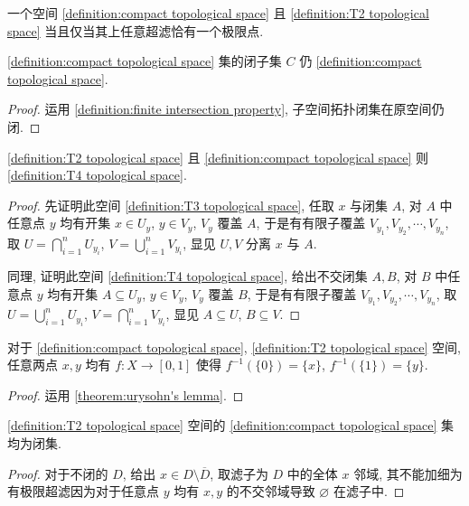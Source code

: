 \begin{corollary}
    一个空间 \ref{definition:compact topological space} 且 \ref{definition:T2 topological space} 当且仅当其上任意超滤恰有一个极限点.
\end{corollary}

\begin{lemma}
    \ref{definition:compact topological space} 集的闭子集 \(C\) 仍 \ref{definition:compact topological space}.

    \begin{proof}
        运用 \ref{definition:finite intersection property}, 子空间拓扑闭集在原空间仍闭.
    \end{proof}
\end{lemma}

\begin{lemma}
    \ref{definition:T2 topological space} 且 \ref{definition:compact topological space} 则 \ref{definition:T4 topological space}.

    \begin{proof}
        先证明此空间 \ref{definition:T3 topological space}, 任取 \(x\) 与闭集 \(A\),
        对 \(A\) 中任意点 \(y\) 均有开集 \(x \in U_y\), \(y \in V_y\), \(V_y\) 覆盖 \(A\), 于是有有限子覆盖 \(V_{y_1}, V_{y_2}, \cdots, V_{y_n}\),
        取 \(U = \bigcap_{i = 1}^n U_{y_i}\), \(V = \bigcup_{i = 1}^n V_{y_i}\), 显见 \(U,V\) 分离 \(x\) 与 \(A\).

        同理, 证明此空间 \ref{definition:T4 topological space}, 给出不交闭集 \(A,B\), 对 \(B\) 中任意点 \(y\) 均有开集 \(A \subseteq U_y\), \(y \in V_y\), \(V_y\) 覆盖 \(B\),
        于是有有限子覆盖 \(V_{y_1}, V_{y_2}, \cdots, V_{y_n}\), 取 \(U = \bigcup_{i = 1}^n U_{y_i}\), \(V = \bigcap_{i = 1}^n V_{y_i}\), 显见 \(A \subseteq U\), \(B \subseteq V\).
    \end{proof}
\end{lemma}

\begin{corollary}
    对于 \ref{definition:compact topological space}, \ref{definition:T2 topological space} 空间, 任意两点 \(x,y\) 均有 \(f : X \to [0,1]\) 使得 \(f^{-1} (\{0\}) = \{x\}\), \(f^{-1} (\{1\}) = \{y\}\).

    \begin{proof}
        运用 \ref{theorem:urysohn's lemma}.
    \end{proof}
\end{corollary}

\begin{lemma}
    \label {lemma:T2 compactness implies closedness}
    \ref{definition:T2 topological space} 空间的 \ref{definition:compact topological space} 集均为闭集.

    \begin{proof}
        对于不闭的 \(D\), 给出 \(x \in D \setminus \overline{D}\),
        取滤子为 \(D\) 中的全体 \(x\) 邻域, 其不能加细为有极限超滤因为对于任意点 \(y\) 均有
        \(x,y\) 的不交邻域导致 \(\varnothing\) 在滤子中.
    \end{proof}
\end{lemma}

